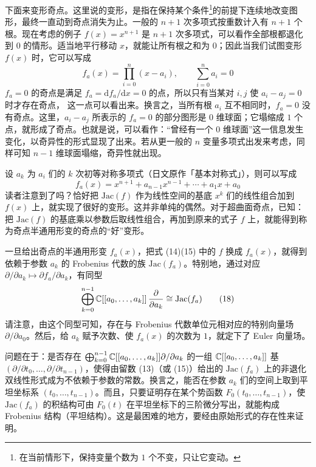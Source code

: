 下面来变形奇点。这里说的变形，是指在保持某个条件\footnote{在当前情形下，保持变量个数为 $1$ 个不变，只让它变动。}的前提下连续地改变图形，最终一直动到奇点消失为止。一般的 $n+1$ 次多项式按重数计入有 $n+1$ 个根。现在考虑的例子 $f(x)=x^{n+1}$ 是 $n+1$ 次多项式，可以看作全部根都退化到 $0$ 的情形。适当地平行移动 $x$，就能让所有根之和为 $0$；因此当我们试图变形 $f(x)$ 时，它可以写成
\begin{equation}
  f_a(x)=\prod_{i=0}^{n}(x-a_i),\qquad \sum_{i=0}^{n}a_i=0
  \tag{16}
\end{equation}
$f_a=0$ 的奇点是满足 $f_a=\mathrm{d}f_a/\mathrm{d}x=0$ 的点，所以只有当某对 $i,j$ 使 $a_i-a_j=0$ 时才存在奇点，
这一点可以看出来。换言之，当所有根 $a_i$ 互不相同时，$f_a=0$ 没有奇点。这里，$a_i-a_j$ 所表示的 $f_a=0$ 的部分图形是 $0$ 维球面；它塌缩成 $1$ 个点，就形成了奇点。也就是说，可以看作：“曾经有一个 $0$ 维球面”这一信息发生变化，以奇异性的形式显现了出来。若从更一般的 $n$ 变量多项式出发来考虑，同样可知 $n-1$ 维球面塌缩，奇异性就出现。

设 $a_k$ 为 $a_i$ 们的 $k$ 次初等对称多项式（日文原作「基本対称式」），则可以写成
\begin{equation}
  f_a(x)=x^{n+1}+a_{n-1}x^{n-1}+\cdots+a_1x+a_0
  \tag{17}
\end{equation}
读者注意到了吗？恰好把 $\mathrm{Jac}(f)$ 作为线性空间的基底 $x^k$ 们的线性组合加到 $f(x)$ 上，就实现了很好的变形。这并非单纯的偶然。对于超曲面奇点，已知：把 $\mathrm{Jac}(f)$ 的基底乘以参数后取线性组合，再加到原来的式子 $f$ 上，就能得到称为奇点半通用形变的奇点的“好”变形。

一旦给出奇点的半通用形变 $f_a(x)$，把式 (14)(15) 中的 $f$ 换成 $f_a(x)$，就得到依赖于参数 $a_k$ 的 Frobenius 代数的族 $\mathrm{Jac}(f_a)$。特别地，通过对应 $\partial/\partial a_k\mapsto\partial f_a/\partial a_k$，有同型
\begin{equation}
  \bigoplus_{k=0}^{n-1}\mathbb{C}[[a_0,\dots,a_k]]\,\frac{\partial}{\partial a_k}
  \cong \mathrm{Jac}(f_a)
  \tag{18}
\end{equation}
请注意，由这个同型可知，存在与 Frobenius 代数单位元相对应的特别向量场 $\partial/\partial a_0$。然后，给 $a_k$ 赋予次数、使 $f_a(x)$ 的次数为 $1$，就定下了 Euler 向量场。

问题在于：是否存在 $\bigoplus_{k=0}^{n-1}\mathbb{C}[[a_0,\dots,a_k]]\partial/\partial a_k$ 的一组 $\mathbb{C}[[a_0,\dots,a_k]]$ 基 $(\partial/\partial t_0,\dots,\partial/\partial t_{n-1})$，使得由留数 (13)（或 (15)）给出的 $\mathrm{Jac}(f_a)$ 上的非退化双线性形式成为不依赖于参数的常数。换言之，能否在参数 $a_k$ 们的空间上取到平坦坐标系 $(t_0,\dots,t_{n-1})$。而且，只要证明存在某个势函数 $F_0(t_0,\dots,t_{n-1})$，使 $\mathrm{Jac}(f_a)$ 的积结构可由 $F_0(t)$ 在平坦坐标下的三阶微分写出，就能构成 Frobenius 结构（平坦结构）。这是最困难的地方，要经由原始形式的存在性来证明。

